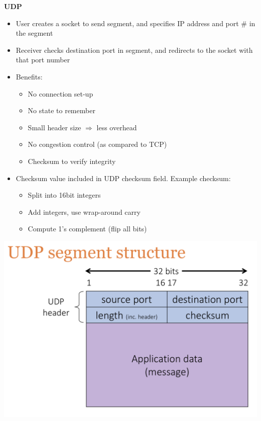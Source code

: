 \documentclass[a4paper]{article} \usepackage[backend=biber, style=numeric, sorting=none]{biblatex}
\begin{document}
\begin{multicols*}{4}
\textbf{UDP}
\begin{itemize}[leftmargin=*]
\item User creates a socket to send segment, and specifies IP address and port \# in the segment
\item Receiver checks destination port in segment, and redirects to the socket with that port number
\item Benefits:
  \begin{itemize}[leftmargin=*]
  \item No connection set-up
  \item No state to remember
  \item Small header size $\Rightarrow$ less overhead
  \item No congestion control (as compared to TCP)
  \item Checksum to verify integrity
  \end{itemize}
\item Checksum value included in UDP checksum field. Example checksum:
  \begin{itemize}[leftmargin=*]
  \item Split into 16bit integers
  \item Add integers, use wrap-around carry
  \item Compute 1's complement (flip all bits)
  \end{itemize}
\end{itemize}

{\centering \includegraphics[scale=0.20]{udp_segment_structure}}


\end{multicols*}
\end{document}
